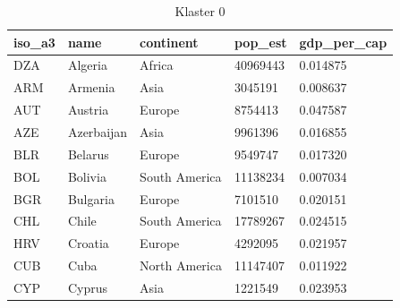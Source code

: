 \documentclass[11pt]{report}
\begin{document}
    \begin{table}[]
        \caption {Klaster 0} \label{tab:cl0}
        \begin{tabular}{lllll}
            \hline
            \multicolumn{1}{|l|}{iso\_a3} & \multicolumn{1}{l|}{name} & \multicolumn{1}{l|}{continent} & \multicolumn{1}{l|}{pop\_est} & \multicolumn{1}{l|}{gdp\_per\_cap} \\ \hline
            DZA                           & Algeria                   & Africa                         & 40969443                      & 0.014875                           \\
            ARM                           & Armenia                   & Asia                           & 3045191                       & 0.008637                           \\
            AUT                           & Austria                   & Europe                         & 8754413                       & 0.047587                           \\
            AZE                           & Azerbaijan                & Asia                           & 9961396                       & 0.016855                           \\
            BLR                           & Belarus                   & Europe                         & 9549747                       & 0.017320                           \\
            BOL                           & Bolivia                   & South America                  & 11138234                      & 0.007034                           \\
            BGR                           & Bulgaria                  & Europe                         & 7101510                       & 0.020151                           \\
            CHL                           & Chile                     & South America                  & 17789267                      & 0.024515                           \\
            HRV                           & Croatia                   & Europe                         & 4292095                       & 0.021957                           \\
            CUB                           & Cuba                      & North America                  & 11147407                      & 0.011922                           \\
            CYP                           & Cyprus                    & Asia                           & 1221549                       & 0.023953                           \\

\end{tabular}
\end{table}
\end{document}
